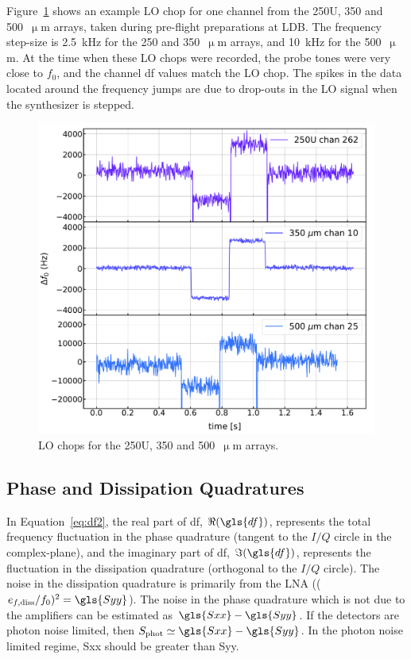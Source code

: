 Figure~\ref{fig:lo chops} shows an example LO chop for one channel from the 250U, 350 and 500~$\upmu$m arrays, taken during pre-flight preparations at LDB\@. The frequency step-size is 2.5~kHz for the 250 and 350~$\upmu$m arrays, and 10~kHz for the 500~$\upmu$m. At the time when these LO chops were recorded, the probe tones were very close to $f_{0}$, and the channel \gls{df} values match the LO chop. The spikes in the data located around the frequency jumps are due to drop-outs in the LO signal when the synthesizer is stepped.

\begin{figure}[!htbp]
\centering
\includegraphics[width=\textwidth]{figures/blast_data/timestreams/ice_lo_chops}
\caption[~LO chops for the 250U, 350 and 500~ arrays.]{LO chops for the 250U, 350 and 500~$\upmu$m arrays.}
\label{fig:lo chops}
\end{figure}

\subsection{Phase and Dissipation Quadratures}

In Equation~\ref{eq:df2}, the real part of \gls{df}, $\Re(\gls{df})$, represents the total frequency fluctuation in the phase quadrature (tangent to the $I/Q$ circle in the complex-plane), and the imaginary part of \gls{df}, $\Im(\gls{df})$, represents the fluctuation in the dissipation quadrature (orthogonal to the $I/Q$ circle). The noise in the dissipation quadrature is primarily from the LNA (($e_{f,\mathrm{diss}}/f_{0})^{2} = \gls{Syy}$). The noise in the phase quadrature which is not due to the amplifiers can be estimated as $\gls{Sxx} - \gls{Syy}$. If the detectors are photon noise limited, then $S_{\mathrm{phot}} \simeq \gls{Sxx} - \gls{Syy}$. In the photon noise limited regime, \gls{Sxx} should be greater than \gls{Syy}.

